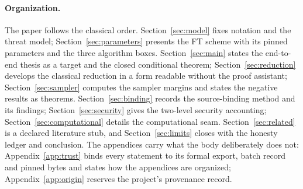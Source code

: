 \paragraph{Organization.}
The paper follows the classical order. Section~\ref{sec:model}
fixes notation and the threat model;
Section~\ref{sec:parameters} presents the FT scheme with its pinned
parameters and the three algorithm boxes. Section~\ref{sec:main}
states the end-to-end thesis as a target and the closed conditional
theorem; Section~\ref{sec:reduction} develops the classical reduction
in a form readable without the proof assistant;
Section~\ref{sec:sampler} computes the sampler margins and states the
negative results as theorems. Section~\ref{sec:binding} records the
source-binding method and its findings;
Section~\ref{sec:security} gives the two-level security accounting;
Section~\ref{sec:computational} details the computational seam.
Section~\ref{sec:related} is a declared literature stub, and
Section~\ref{sec:limits} closes with the honesty ledger and
conclusion. The appendices carry what the body deliberately does not:
Appendix~\ref{app:trust} binds every statement to its formal export,
batch record and pinned bytes and states how the appendices are
organized; Appendix~\ref{app:origin} reserves the project's provenance
record.
